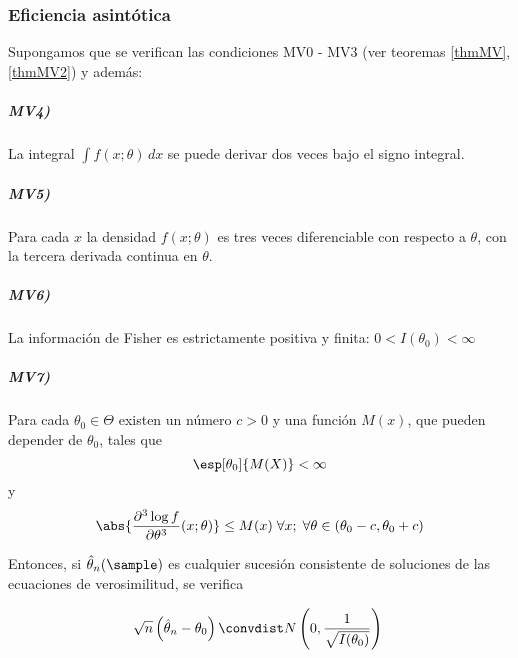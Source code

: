 \documentclass{apuntes}
\begin{document}
\subsubsection{Eficiencia asintótica}
\begin{theorem}[Teorema\IS MV3] Supongamos que se verifican las condiciones MV0 - MV3 (ver teoremas \ref{thmMV}, \ref{thmMV2}) y además:

\subparagraph{MV4)} La integral $\int f(x;\theta)\,dx$ se puede derivar dos veces bajo el signo integral.
\subparagraph{MV5)} Para cada $x$ la densidad $f(x;\theta)$ es tres veces diferenciable con respecto a $\theta$, con la tercera derivada continua en $\theta$.
\subparagraph{MV6)} La información de Fisher es estrictamente positiva y finita: $0 < I(\theta_0) < \infty$
\subparagraph{MV7)} Para cada $\theta_0\in \Theta$ existen un número $c > 0$ y una función $M(x)$, que pueden depender de $\theta_0$, tales que \[ \esp[\theta_0]{M(X)} < \infty \] y \[ \abs{\frac{\partial^3\log f}{\partial\theta^3}(x;\theta)} \leq M(x)\; \forall x;\;\forall\theta \in (\theta_0 - c,\theta_0 + c) \]

Entonces, si $\hat{\theta}_n(\sample)$ es cualquier sucesión consistente de soluciones de las ecuaciones de verosimilitud, se verifica

\[ \sqrt{n}\left(\hat{\theta}_n-\theta_0\right) \convdist N\left(0,\frac{1}{\sqrt{I(\theta_0)}}\right) \]

\end{theorem}
\end{document}
